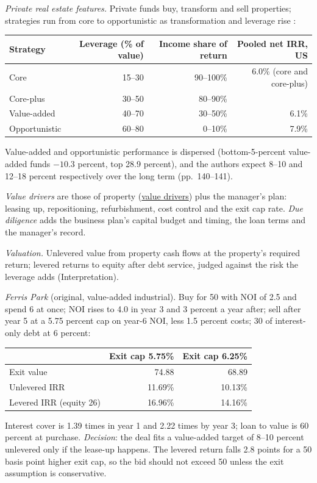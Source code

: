 \begin{qfmethod}\label{meth:private-real-estate-underwriting}
 \emph{Private real estate features.} Private funds buy, transform and sell properties; strategies run from core to opportunistic as transformation and leverage rise \citep[pp.~137--141]{demaria-private-markets-2021}:
\begin{center}\small
\begin{tabular}{@{}lrrr@{}}
\toprule
Strategy & Leverage (\% of value) & Income share of return & Pooled net IRR, US \\
\midrule
Core & 15--30 & 90--100\% & 6.0\% (core and core-plus) \\
Core-plus & 30--50 & 80--90\% & \\
Value-added & 40--70 & 30--50\% & 6.1\% \\
Opportunistic & 60--80 & 0--10\% & 7.9\% \\
\bottomrule
\end{tabular}
\end{center}
Value-added and opportunistic performance is dispersed (bottom-5-percent value-added funds $-10.3$ percent, top 28.9 percent), and the authors expect 8--10 and 12--18 percent respectively over the long term (pp.~140--141).

\emph{Value drivers} are those of property (\hyperref[meth:real-estate-value-drivers]{value drivers}) plus the manager's plan: leasing up, repositioning, refurbishment, cost control and the exit cap rate. \emph{Due diligence} adds the business plan's capital budget and timing, the loan terms and the manager's record.

\emph{Valuation.} Unlevered value from property cash flows at the property's required return; levered returns to equity after debt service, judged against the risk the leverage adds (Interpretation).

 \emph{Ferris Park} (original, value-added industrial). Buy for 50 with NOI of 2.5 and spend 6 at once; NOI rises to 4.0 in year 3 and 3 percent a year after; sell after year 5 at a 5.75 percent cap on year-6 NOI, less 1.5 percent costs; 30 of interest-only debt at 6 percent:
\begin{center}\small
\begin{tabular}{@{}lrr@{}}
\toprule
 & Exit cap 5.75\% & Exit cap 6.25\% \\
\midrule
Exit value & 74.88 & 68.89 \\
Unlevered IRR & 11.69\% & 10.13\% \\
Levered IRR (equity 26) & 16.96\% & 14.16\% \\
\bottomrule
\end{tabular}
\end{center}
Interest cover is 1.39 times in year 1 and 2.22 times by year 3; loan to value is 60 percent at purchase. \emph{Decision}: the deal fits a value-added target of 8--10 percent unlevered only if the lease-up happens. The levered return falls 2.8 points for a 50 basis point higher exit cap, so the bid should not exceed 50 unless the exit assumption is conservative.


\end{qfmethod}
